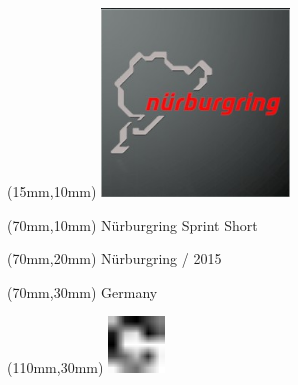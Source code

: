 \null\newpage
\begin{textblock*}{50mm}(15mm,10mm)%
\includegraphics[width=50mm]{LG/2015-05-20_00089.png}
\end{textblock*}
\begin{textblock*}{130mm}(70mm,10mm)%
{\fontsize{20}{20}\selectfont Nürburgring Sprint Short}\\
\end{textblock*}
\begin{textblock*}{120mm}(70mm,20mm)%
{\fontsize{16}{16}\selectfont Nürburgring / 2015}\\
\end{textblock*}
\begin{textblock*}{120mm}(70mm,30mm)%
{\fontsize{12}{12}\selectfont Germany}
\end{textblock*}
\begin{textblock*}{30mm}(110mm,30mm)%
\centering
\includegraphics[height=15mm]{icons/fa-rotate-right.pdf}
\end{textblock*}

